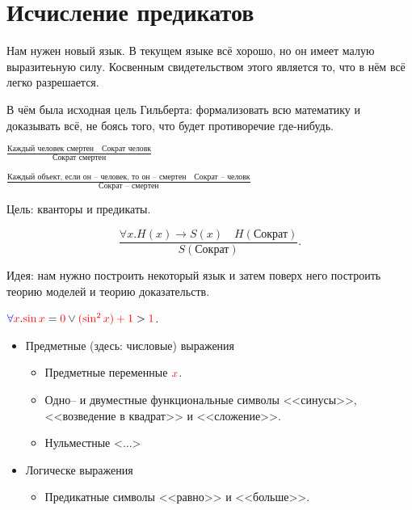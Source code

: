 \section{Исчисление предикатов}

Нам нужен новый язык. В текущем языке всё хорошо, но он имеет малую выразитеьную силу. Косвенным свидетельством этого является то, что в нём всё легко разрешается.

В чём была исходная цель Гильберта: формализовать всю математику и доказывать всё, не боясь того, что будет противоречие где-нибудь.


\begin{example}
    $\frac{\text{Каждый человек смертен}\quad  \text{Сократ человк}}{\text{Сократ смертен}}$    

    $\frac{\text{Каждый объект, если он -- человек, то он -- смертен}\quad  \text{Сократ -- человк}}{\text{Сократ -- смертен}}$    

    Цель: {\color{blue} кванторы} и {\color{red}предикаты}.

    \[
    \frac{\forall x.H(x) \to S(x)\quad H(\text{Сократ})}{S(\text{Сократ})}
    .\] 
\end{example}

Идея: нам нужно построить некоторый язык и затем поверх него построить теорию моделей и теорию доказательств.

\begin{example}
    ${\color{blue} \forall} {\color{red}x}. {\color{red}\sin x} = {\color{red}0} \lor {\color{red}(\sin^2 x) + 1} > {\color{red}1}$.

    \begin{itemize}
        \item Предметные (здесь: числовые) выражения
        \begin{itemize}
            \item Предметные переменные ${\color{red}x}$.
            \item Одно-- и двуместные функциональные символы <<синусы>>, <<возведение в квадрат>> и <<сложение>>.
            \item Нульместные <...>
        \end{itemize}
        \item Логическе выражения
        \begin{itemize}
            \item Предикатные символы <<равно>> и <<больше>>.
        \end{itemize}
    \end{itemize}
\end{example}

